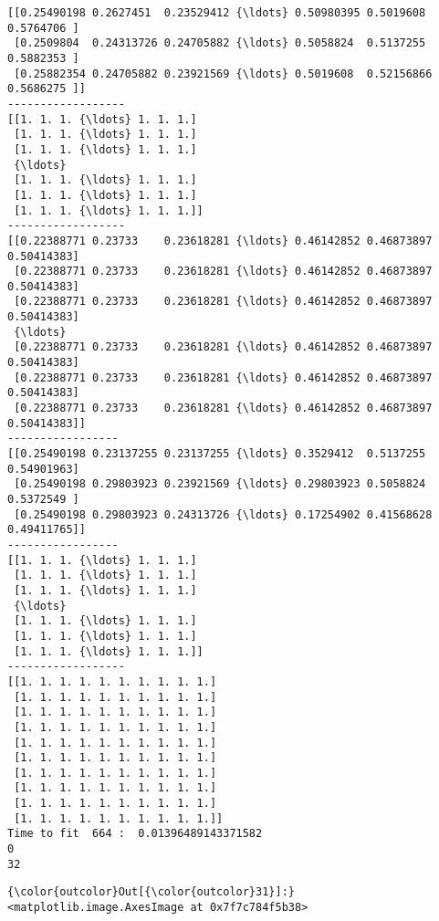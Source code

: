 \documentclass[11pt]{article}
\begin{document}
    \begin{Verbatim}[commandchars=\\\{\}]
[[0.25490198 0.2627451  0.23529412 {\ldots} 0.50980395 0.5019608  0.5764706 ]
 [0.2509804  0.24313726 0.24705882 {\ldots} 0.5058824  0.5137255  0.5882353 ]
 [0.25882354 0.24705882 0.23921569 {\ldots} 0.5019608  0.52156866 0.5686275 ]]
------------------
[[1. 1. 1. {\ldots} 1. 1. 1.]
 [1. 1. 1. {\ldots} 1. 1. 1.]
 [1. 1. 1. {\ldots} 1. 1. 1.]
 {\ldots}
 [1. 1. 1. {\ldots} 1. 1. 1.]
 [1. 1. 1. {\ldots} 1. 1. 1.]
 [1. 1. 1. {\ldots} 1. 1. 1.]]
------------------
[[0.22388771 0.23733    0.23618281 {\ldots} 0.46142852 0.46873897 0.50414383]
 [0.22388771 0.23733    0.23618281 {\ldots} 0.46142852 0.46873897 0.50414383]
 [0.22388771 0.23733    0.23618281 {\ldots} 0.46142852 0.46873897 0.50414383]
 {\ldots}
 [0.22388771 0.23733    0.23618281 {\ldots} 0.46142852 0.46873897 0.50414383]
 [0.22388771 0.23733    0.23618281 {\ldots} 0.46142852 0.46873897 0.50414383]
 [0.22388771 0.23733    0.23618281 {\ldots} 0.46142852 0.46873897 0.50414383]]
-----------------
[[0.25490198 0.23137255 0.23137255 {\ldots} 0.3529412  0.5137255  0.54901963]
 [0.25490198 0.29803923 0.23921569 {\ldots} 0.29803923 0.5058824  0.5372549 ]
 [0.25490198 0.29803923 0.24313726 {\ldots} 0.17254902 0.41568628 0.49411765]]
-----------------
[[1. 1. 1. {\ldots} 1. 1. 1.]
 [1. 1. 1. {\ldots} 1. 1. 1.]
 [1. 1. 1. {\ldots} 1. 1. 1.]
 {\ldots}
 [1. 1. 1. {\ldots} 1. 1. 1.]
 [1. 1. 1. {\ldots} 1. 1. 1.]
 [1. 1. 1. {\ldots} 1. 1. 1.]]
------------------
[[1. 1. 1. 1. 1. 1. 1. 1. 1. 1.]
 [1. 1. 1. 1. 1. 1. 1. 1. 1. 1.]
 [1. 1. 1. 1. 1. 1. 1. 1. 1. 1.]
 [1. 1. 1. 1. 1. 1. 1. 1. 1. 1.]
 [1. 1. 1. 1. 1. 1. 1. 1. 1. 1.]
 [1. 1. 1. 1. 1. 1. 1. 1. 1. 1.]
 [1. 1. 1. 1. 1. 1. 1. 1. 1. 1.]
 [1. 1. 1. 1. 1. 1. 1. 1. 1. 1.]
 [1. 1. 1. 1. 1. 1. 1. 1. 1. 1.]
 [1. 1. 1. 1. 1. 1. 1. 1. 1. 1.]]
Time to fit  664 :  0.01396489143371582
0
32

    \end{Verbatim}

\begin{Verbatim}[commandchars=\\\{\}]
{\color{outcolor}Out[{\color{outcolor}31}]:} <matplotlib.image.AxesImage at 0x7f7c784f5b38>
\end{Verbatim}
            
    \begin{center}
    \end{center}
    { \hspace*{\fill} \\}
    
\end{document}
